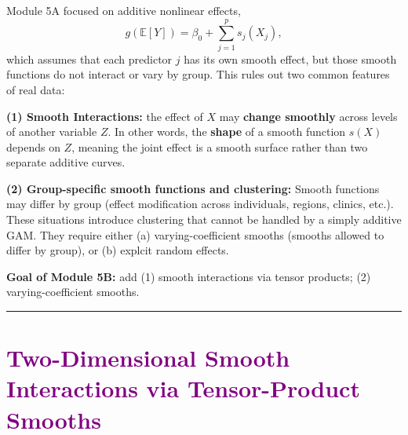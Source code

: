 \documentclass[
  letterpaper,
  DIV=11,
  numbers=noendperiod]{scrreprt}
\begin{document}
\begin{tcolorbox}[enhanced jigsaw, breakable, colbacktitle=quarto-callout-important-color!10!white, left=2mm, colframe=quarto-callout-important-color-frame, opacityback=0, coltitle=black, colback=white, rightrule=.15mm, title=\textcolor{quarto-callout-important-color}{\faExclamation}\hspace{0.5em}{Motivation}, titlerule=0mm, opacitybacktitle=0.6, leftrule=.75mm, toprule=.15mm, arc=.35mm, bottomtitle=1mm, toptitle=1mm, bottomrule=.15mm]

Module 5A focused on additive nonlinear effects, \[
g(\mathbb{E}[Y]) = \beta_0 + \sum_{j=1}^p s_j(X_j),
\] which assumes that each predictor \(j\) has its own smooth effect,
but those smooth functions do not interact or vary by group. This rules
out two common features of real data:

\textbf{(1) Smooth Interactions:} the effect of \(X\) may \textbf{change
smoothly} across levels of another variable \(Z\). In other words, the
\textbf{shape} of a smooth function \(s(X)\) depends on \(Z\), meaning
the joint effect is a smooth surface rather than two separate additive
curves.

\textbf{(2) Group-specific smooth functions and clustering:} Smooth
functions may differ by group (effect modification across individuals,
regions, clinics, etc.). These situations introduce clustering that
cannot be handled by a simply additive GAM. They require either (a)
varying-coefficient smooths (smooths allowed to differ by group), or (b)
explcit random effects.

\textbf{Goal of Module 5B:} add (1) smooth interactions via tensor
products; (2) varying-coefficient smooths.

\end{tcolorbox}

\begin{center}\rule{0.5\linewidth}{0.5pt}\end{center}

\hypertarget{section-31}{%
\section*{\texorpdfstring{\textcolor{purple}{Two-Dimensional Smooth Interactions via Tensor-Product Smooths}}{}}\label{section-31}}

\markright{\textcolor{purple}{Two-Dimensional Smooth Interactions via Tensor-Product Smooths}}
\end{document}
